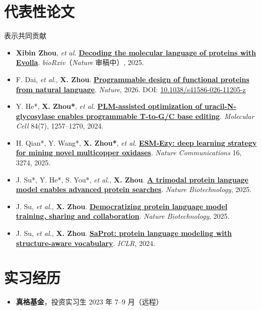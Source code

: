 \documentclass[10pt]{article}
\begin{document}
\section*{代表性论文}
{\footnotesize * 表示共同贡献}
\begin{itemize}
    \item \textbf{Xibin Zhou}, \textit{et al.} \href{https://doi.org/10.1101/2025.01.05.630192}{\textbf{Decoding the molecular language of proteins with Evolla}}. \textit{bioRxiv}（\textit{Nature} 审稿中）, 2025.
    \item F. Dai, \textit{et al.}, \textbf{X. Zhou}. \href{https://doi.org/10.1038/s41586-026-11205-z}{\textbf{Programmable design of functional proteins from natural language}}. \textit{Nature}, 2026. DOI: \href{https://doi.org/10.1038/s41586-026-11205-z}{10.1038/s41586-026-11205-z}
    \item Y. He*, \textbf{X. Zhou*}, \textit{et al.} \href{https://doi.org/10.1016/j.molcel.2024.01.021}{\textbf{PLM-assisted optimization of uracil-N-glycosylase enables programmable T-to-G/C base editing}}. \textit{Molecular Cell} 84(7), 1257--1270, 2024.
    \item H. Qian*, Y. Wang*, \textbf{X. Zhou*}, \textit{et al.} \href{https://doi.org/10.1038/s41467-025-58521-y}{\textbf{ESM-Ezy: deep learning strategy for mining novel multicopper oxidases}}. \textit{Nature Communications} 16, 3274, 2025.
    \item J. Su*, Y. He*, S. You*, \textit{et al.}, \textbf{X. Zhou}. \href{https://doi.org/10.1038/s41587-025-02836-0}{\textbf{A trimodal protein language model enables advanced protein searches}}. \textit{Nature Biotechnology}, 2025.
    \item J. Su, \textit{et al.}, \textbf{X. Zhou}. \href{https://doi.org/10.1038/s41587-025-02859-7}{\textbf{Democratizing protein language model training, sharing and collaboration}}. \textit{Nature Biotechnology}, 2025.
    \item J. Su, \textit{et al.}, \textbf{X. Zhou}. \href{https://openreview.net/forum?id=6MRm3G4NiU}{\textbf{SaProt: protein language modeling with structure-aware vocabulary}}. \textit{ICLR}, 2024.
\end{itemize}

\section*{实习经历}
\begin{itemize}
    \item \textbf{真格基金}，投资实习生 \hfill 2023 年 7--9 月（远程）
\end{itemize}
\end{document}
